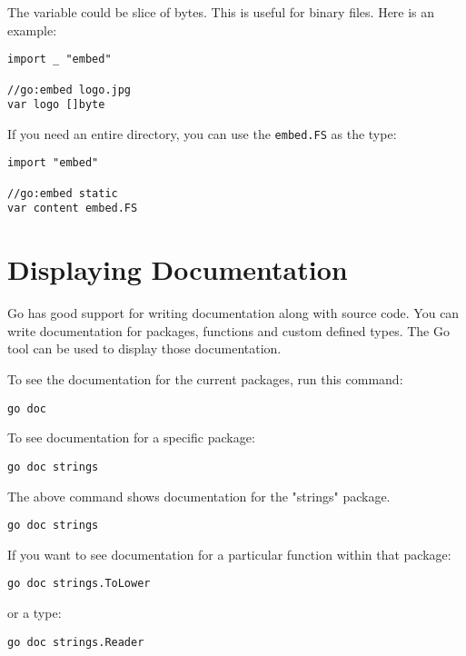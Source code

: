 The variable could be slice of bytes. This is useful for binary files. Here is
an example:

\begin{lstlisting}[numbers=none]
import _ "embed"

//go:embed logo.jpg
var logo []byte
\end{lstlisting}

If you need an entire directory, you can use the \texttt{embed.FS} as the type:

\begin{lstlisting}[numbers=none]
import "embed"

//go:embed static
var content embed.FS
\end{lstlisting}

\section{Displaying Documentation}

Go has good support for writing documentation along with source
code.  You can write documentation for packages,
functions and custom defined types.  The Go tool can be used to
display those documentation.

To see the documentation for the current packages, run this command:

\begin{lstlisting}[numbers=none]
go doc
\end{lstlisting}

To see documentation for a specific package:

\begin{lstlisting}[numbers=none]
go doc strings
\end{lstlisting}

The above command shows documentation for the "strings" package.

\begin{lstlisting}[numbers=none]
go doc strings
\end{lstlisting}

If you want to see documentation for a particular function within that
package:

\begin{lstlisting}[numbers=none]
go doc strings.ToLower
\end{lstlisting}

or a type:

\begin{lstlisting}[numbers=none]
go doc strings.Reader
\end{lstlisting}

